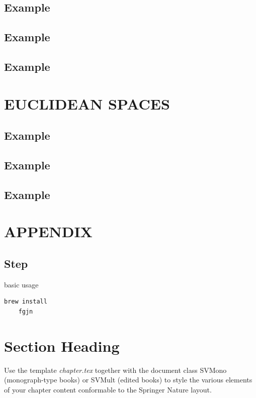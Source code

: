 \subsection*{\textbf{Example}}
\label{sec:33}
\subsection*{\textbf{Example}}
\label{sec:34}
\subsection*{\textbf{Example}}
\label{sec:35}

\section{EUCLIDEAN SPACES}
\subsection*{\textbf{Example}}
\label{sec:36}

\subsection*{\textbf{Example}}
\label{sec:37}
\subsection*{\textbf{Example}}
\label{sec:38}

\section{APPENDIX}

\subsection*{\textbf{Step}}
\label{sec:37}












\label{sec:0}
\begin{programcode}{basic usage}
\begin{verbatim}
brew install
    fgjn
\end{verbatim}
\end{programcode}



\section{Section Heading}
\label{sec:1}
Use the template \emph{chapter.tex} together with the document class SVMono (monograph-type books) or SVMult (edited books) to style the various elements of your chapter content conformable to the Springer Nature layout.


